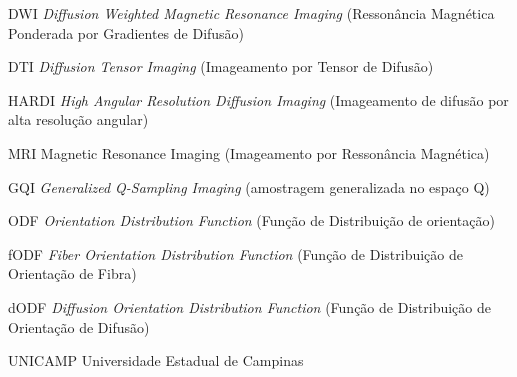 \documentclass[
    12pt,                %
    oneside,            %
    a4paper,            %
    english,            %
    french,                %
    spanish,            %
    brazil                %
    ]{abntex2}
\begin{document}
\begin{siglas}
\item[DWI] \textit{Diffusion Weighted Magnetic Resonance Imaging} (Ressonância Magnética Ponderada por Gradientes de Difusão)
  
\item[DTI] \textit{Diffusion Tensor Imaging} (Imageamento por Tensor de Difusão)

\item[HARDI] \textit{High Angular Resolution Diffusion Imaging} (Imageamento de difusão por alta resolução angular)



\item[MRI] Magnetic Resonance Imaging (Imageamento por Ressonância Magnética)


\item[GQI] \textit{Generalized Q-Sampling Imaging} (amostragem generalizada no espaço Q)


\item[ODF] \textit{Orientation Distribution Function} (Função de Distribuição de orientação)

\item[fODF] \textit{Fiber Orientation Distribution Function} (Função de Distribuição de Orientação de Fibra)

\item[dODF] \textit{Diffusion Orientation Distribution Function} (Função de Distribuição de Orientação de Difusão)


\item[UNICAMP] Universidade Estadual de Campinas



\end{siglas}
\end{document}
